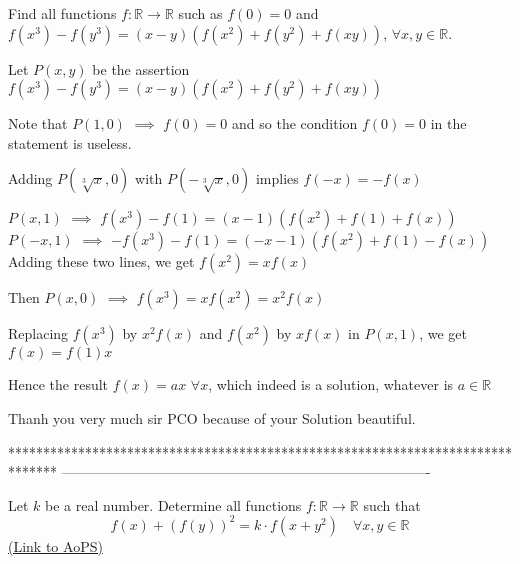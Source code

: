 \begin{solution}
	\begin{tcolorbox}Find all functions $f:\mathbb{R}\to \mathbb{R}$ such as $f(0)=0$ and $f\left( {{x}^{3}} \right)-f\left( {{y}^{3}} \right)=\left( x-y \right)\left( f\left( {{x}^{2}} \right)+f\left( {{y}^{2}} \right)+f\left( xy \right) \right)$, $\forall x,y\in \mathbb{R}$.\end{tcolorbox}
Let $P(x,y)$ be the assertion $f(x^3)-f(y^3)=(x-y)(f(x^2)+f(y^2)+f(xy))$

Note that $P(1,0)$ $\implies$ $f(0)=0$ and so the condition $f(0)=0$ in the statement is useless.

Adding $P(\sqrt[3]x,0)$ with $P(-\sqrt[3]x,0)$ implies $f(-x)=-f(x)$

$P(x,1)$ $\implies$ $f(x^3)-f(1)=(x-1)(f(x^2)+f(1)+f(x))$
$P(-x,1)$ $\implies$ $-f(x^3)-f(1)=(-x-1)(f(x^2)+f(1)-f(x))$
Adding these two lines, we get $f(x^2)=xf(x)$

Then $P(x,0)$ $\implies$ $f(x^3)=xf(x^2)=x^2f(x)$

Replacing $f(x^3)$ by $x^2f(x)$ and $f(x^2)$ by $xf(x)$ in $P(x,1)$, we get $f(x)=f(1)x$

Hence the result $\boxed{f(x)=ax}$ $\forall x$, which indeed is a solution, whatever is $a\in\mathbb R$
\end{solution}



\begin{solution}
	Thanh you very much sir PCO because of your Solution beautiful.
\end{solution}
*******************************************************************************
-------------------------------------------------------------------------------

\begin{problem}
	Let $k$ be a real number. Determine all functions $f:\mathbb R\to\mathbb R$ such that 
\[f(x)+(f(y))^2=k\cdot f(x+y^2) \quad \forall x,y\in\mathbb R\]
	\flushright \href{https://artofproblemsolving.com/community/c6h565932}{(Link to AoPS)}
\end{problem}



